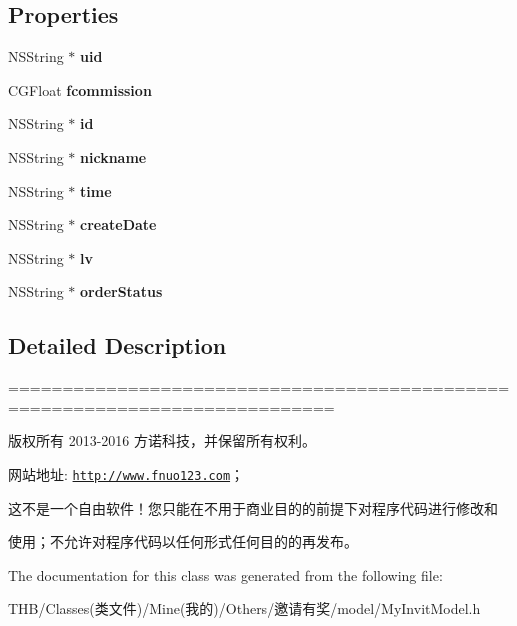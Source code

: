 \subsection*{Properties}
\begin{DoxyCompactItemize}
\item 
\mbox{\label{interface_my_invit_model_a693e9c699b9043a47b0bb53829a0925b}} 
N\+S\+String $\ast$ {\bfseries uid}
\item 
\mbox{\label{interface_my_invit_model_a9df7d70fc17baa1b3ec0c441369f6435}} 
C\+G\+Float {\bfseries fcommission}
\item 
\mbox{\label{interface_my_invit_model_a429e40f6ba6d165889128e9fb1bcfc08}} 
N\+S\+String $\ast$ {\bfseries id}
\item 
\mbox{\label{interface_my_invit_model_ad8f2e2c96e026a98ca96bd4c270d2a07}} 
N\+S\+String $\ast$ {\bfseries nickname}
\item 
\mbox{\label{interface_my_invit_model_ad510b8039ac82dfccfdc5679c314d631}} 
N\+S\+String $\ast$ {\bfseries time}
\item 
\mbox{\label{interface_my_invit_model_a982dacab422cf9002a17b01a770012a8}} 
N\+S\+String $\ast$ {\bfseries create\+Date}
\item 
\mbox{\label{interface_my_invit_model_a6851ef65c979c184488650d04b2db871}} 
N\+S\+String $\ast$ {\bfseries lv}
\item 
\mbox{\label{interface_my_invit_model_aa3e88e7ff705da0442a4757aca1a6707}} 
N\+S\+String $\ast$ {\bfseries order\+Status}
\end{DoxyCompactItemize}


\subsection{Detailed Description}
============================================================================

版权所有 2013-\/2016 方诺科技，并保留所有权利。

网站地址\+: \href{http://www.fnuo123.com}{\tt http\+://www.\+fnuo123.\+com}； 



这不是一个自由软件！您只能在不用于商业目的的前提下对程序代码进行修改和

使用；不允许对程序代码以任何形式任何目的的再发布。 

 

The documentation for this class was generated from the following file\+:\begin{DoxyCompactItemize}
\item 
T\+H\+B/\+Classes(类文件)/\+Mine(我的)/\+Others/邀请有奖/model/My\+Invit\+Model.\+h\end{DoxyCompactItemize}
